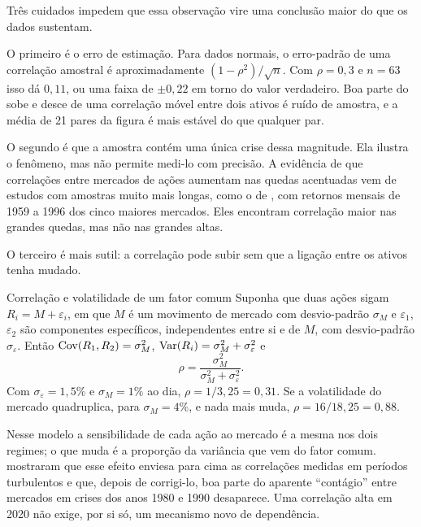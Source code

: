 Três cuidados impedem que essa observação vire uma conclusão maior do que os dados sustentam.

O primeiro é o erro de estimação. Para dados normais, o erro-padrão de uma correlação amostral é aproximadamente $(1-\rho^2)/\sqrt{n}$. Com $\rho = 0,3$ e $n = 63$ isso dá $0,11$, ou uma faixa de $\pm 0,22$ em torno do valor verdadeiro. Boa parte do sobe e desce de uma correlação móvel entre dois ativos é ruído de amostra, e a média de 21 pares da figura é mais estável do que qualquer par.

O segundo é que a amostra contém uma única crise dessa magnitude. Ela ilustra o fenômeno, mas não permite medi-lo com precisão. A evidência de que correlações entre mercados de ações aumentam nas quedas acentuadas vem de estudos com amostras muito mais longas, como o de \citet{longin2001}, com retornos mensais de 1959 a 1996 dos cinco maiores mercados. Eles encontram correlação maior nas grandes quedas, mas não nas grandes altas.

O terceiro é mais sutil: a correlação pode subir sem que a ligação entre os ativos tenha mudado.

\begin{exemplo}{Correlação e volatilidade de um fator comum}
Suponha que duas ações sigam $R_i = M + \varepsilon_i$, em que $M$ é um movimento de mercado com desvio-padrão $\sigma_M$ e $\varepsilon_1$, $\varepsilon_2$ são componentes específicos, independentes entre si e de $M$, com desvio-padrão $\sigma_\varepsilon$. Então $\operatorname{Cov}(R_1, R_2) = \sigma_M^2$, $\operatorname{Var}(R_i) = \sigma_M^2 + \sigma_\varepsilon^2$ e
\[
  \rho = \frac{\sigma_M^2}{\sigma_M^2 + \sigma_\varepsilon^2} .
\]
Com $\sigma_\varepsilon = 1,5\%$ e $\sigma_M = 1\%$ ao dia, $\rho = 1/3,25 = 0,31$. Se a volatilidade do mercado quadruplica, para $\sigma_M = 4\%$, e nada mais muda, $\rho = 16/18,25 = 0,88$.
\end{exemplo}

Nesse modelo a sensibilidade de cada ação ao mercado é a mesma nos dois regimes; o que muda é a proporção da variância que vem do fator comum. \citet{forbes2002} mostraram que esse efeito enviesa para cima as correlações medidas em períodos turbulentos e que, depois de corrigi-lo, boa parte do aparente ``contágio'' entre mercados em crises dos anos 1980 e 1990 desaparece. Uma correlação alta em 2020 não exige, por si só, um mecanismo novo de dependência.

